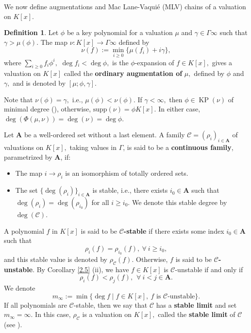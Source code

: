 \documentclass[11pt]{amsart}
\theoremstyle{definition}
\newtheorem{definition}[theorem]{Definition}
\theoremstyle{remark}
\numberwithin{equation}{section}
\begin{document}
We now define augmentations and Mac Lane-Vaqui\'e (MLV) chains of a valuation on $K[x].$
\begin{definition}
	Let $\phi$ be a key polynomial for a valuation $\mu$ and $\gamma\in\Gamma\infty$ such that $\gamma> \mu(\phi)$. The map $\nu: K[x]\longrightarrow \Gamma\infty$ defined by 
	$$\nu(f):=\min_{i\geq 0}\{\mu(f_i)+i\gamma\},$$ where
	$\sum_{i\geq 0}f_i \phi^i, $ $\deg f_i<\deg \phi,$ is the $\phi$-expansion of $f\in K[x],$  gives a valuation on $K[x]$  called the {\bf ordinary augmentation of} $\mu,$ defined by $\phi$ and $\gamma,$ and is  denoted  by $[\mu; \phi,\gamma].$
\end{definition}
Note that $\nu(\phi)=\gamma,$ i.e., $\mu(\phi)<\nu(\phi).$ If $\gamma<\infty,$ then $\phi\in\operatorname{KP}(\nu)$ of minimal degree (\cite[Proposition 2.1]{EN1}), otherwise, $\text{supp}(\nu)=\phi K[x].$ In either case, $\deg(\Phi(\mu,\nu))=\deg (\nu)=\deg\phi.$ 

Let $\mathbf{A}$ be a well-ordered set without a last element. A family $\mathcal{C}=(\rho_i)_{i\in\mathbf{A}}$ of valuations on $K[x],$ taking values in $\Gamma$, is said to be a {\bf continuous family}, parametrized by $\mathbf{A}$, if:
\begin{itemize}
\item The map $i\longrightarrow \rho_i$ is an isomorphism of totally ordered sets.
\item The set $\{\deg(\rho_i)\}_{i\in\mathbf{A}}$ is stable, i.e., there exists $i_0\in\mathbf{A}$ such that $\deg(\rho_i)=\deg(\rho_{i_0})$ for all $i\geq i_0$. We denote this stable degree by $\deg(\mathcal{C})$.
\end{itemize}
A polynomial $f$ in $K[x]$ is said to be {\bf $\mathcal{C}$-stable}  if there exists some index $i_0\in\mathbf{A}$ such that
$$\rho_i(f)=\rho_{i_0}(f),~ \forall~ i\geq i_0,$$  and this stable value is denoted by $\rho_\mathcal{C}(f).$ Otherwise, $f$ is said to be {\bf $\mathcal{C}$-unstable}. By Corollary \ref{2.5} (ii), we have $f\in K[x]$  is $\mathcal{C}$-unstable if and only if  
$$\rho_i(f)<\rho_j(f),\hspace{5pt} \forall~ i<j\in\mathbf{A}.$$  
We denote 
$$m_{\infty}:=\min\{\deg f\mid f\in K[x],~\text{$f$ is $\mathcal{C}$-unstable}\}.$$ If  all polynomials are $\mathcal{C}$-stable, then we say that $\mathcal{C}$ has a {\bf stable limit} and set $m_{\infty}=\infty$. In this case, $\rho_{\mathcal{C}}$ is a valuation on $K[x],$ called the {\bf stable limit} of $\mathcal{C}$ (see \cite[Proposition 3.1]{EN1}). 
\end{document}
